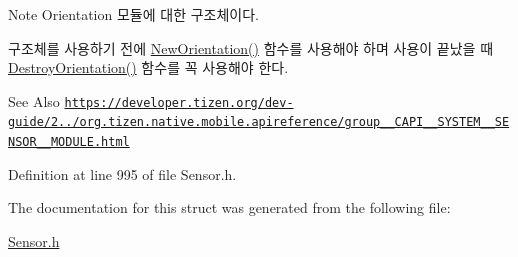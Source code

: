 \begin{DoxyNote}{Note}
Orientation 모듈에 대한 구조체이다. \par
 구조체를 사용하기 전에 \hyperlink{Sensor_8h_a12902ef31bcac8b287d775743c1b774d}{New\-Orientation()} 함수를 사용해야 하며 사용이 끝났을 때 \hyperlink{Sensor_8h_ab42d602375fb6943a8823543a349100a}{Destroy\-Orientation()} 함수를 꼭 사용해야 한다. 
\end{DoxyNote}
\begin{DoxySeeAlso}{See Also}
\href{https://developer.tizen.org/dev-guide/2.3.0/org.tizen.native.mobile.apireference/group__CAPI__SYSTEM__SENSOR__MODULE.html}{\tt https\-://developer.\-tizen.\-org/dev-\/guide/2../org.\-tizen.\-native.\-mobile.\-apireference/group\-\_\-\-\_\-\-C\-A\-P\-I\-\_\-\-\_\-\-S\-Y\-S\-T\-E\-M\-\_\-\-\_\-\-S\-E\-N\-S\-O\-R\-\_\-\-\_\-\-M\-O\-D\-U\-L\-E.\-html} 
\end{DoxySeeAlso}


Definition at line 995 of file Sensor.\-h.



The documentation for this struct was generated from the following file\-:\begin{DoxyCompactItemize}
\item 
\hyperlink{Sensor_8h}{Sensor.\-h}\end{DoxyCompactItemize}
